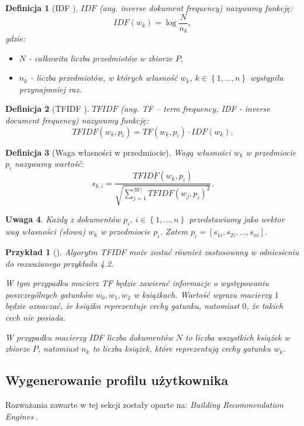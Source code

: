 \documentclass[12pt,a4paper]{report}
\newtheorem{df}{Definicja}[chapter]
\newtheorem{przyklad}{Przykład}[chapter]{\normalfont}
\newtheorem{uwaga}[df]{Uwaga}
\newcommand{\set}[1]{\left\lbrace {#1} \right\rbrace}
\newcommand{\setPrzedmioty}{\mathit{P}}
\begin{document}
\begin{df}[IDF {\citep[Sec 3.3.1.1]{rsh}}]
$IDF$ (ang. \textit{inverse dokument frequency}) nazywamy funkcję:
$$
IDF(w_k) = \log \frac{N}{n_k},
$$
gdzie:
\begin{itemize}
\item $N$ - całkowita liczba przedmiotów w zbiorze $\setPrzedmioty$,
\item $n_k$ - liczba przedmiotów, w których własność $w_k$, $k \in \set{1, \ldots, n}$ wystąpiła przynajmniej raz.
\end{itemize}
\end{df}

\begin{df}[TFIDF {\citep[Sec 3.3.1.1]{rsh}}]
$TFIDF$ (ang. \textit{TF – term frequency, IDF - inverse document frequency}) nazywamy funkcję:
$$
TFIDF(w_k, p_i) = TF(w_k, p_i) \cdot IDF(w_k).
$$
\end{df}

\begin{df}[Waga własności w przedmiocie]
Wagą własności $w_k$ w przedmiocie $p_i$ nazywamy wartość:
$$
s_{k,i} = \frac{TFIDF(w_k, p_i)}{\sqrt{ \sum_{j=1}^{|W|}{TFIDF(w_j, p_i)}^2}}.
$$
\end{df}

\begin{uwaga}
Każdy z dokumentów $p_i, \: i\in\set{1,\ldots,n} $ przedstawiamy jako wektor wag własności (słowa) $w_k$ w przedmiocie $p_i$. Zatem $ p_i = [s_{1i}, s_{2i},...,s_{ni}] $.
\end{uwaga}

\begin{przyklad} [{\citep[Sec 3]{bre}}]
Algorytm TFIDF może zostać również zastosowany w odniesieniu do rozważanego przykładu 4.2.

W tym przypadku macierz TF będzie zawierać informacje o występowaniu poszczególnych gatunków $w_0, w_1,w_2$ w książkach.
Wartość wyrazu macierzy $1$ będzie oznaczać, że książka reprezentuje cechy gatunku, natomiast $0$, że takich cech nie posiada.

W przypadku macierzy IDF liczba dokumentów $N$ to liczba wszystkich książek w zbiorze $\setPrzedmioty$, natomiast $n_k$ to liczba książek, które reprezentują cechy gatunku $w_k$.
\end{przyklad}
\bigskip
\bigskip
\bigskip

\subsection{Wygenerowanie profilu użytkownika}
Rozważania zawarte w tej sekcji zostały oparte na: \textit{Building Recommendation Engines} {\citep[Sec 3]{bre}}.
\end{document}
